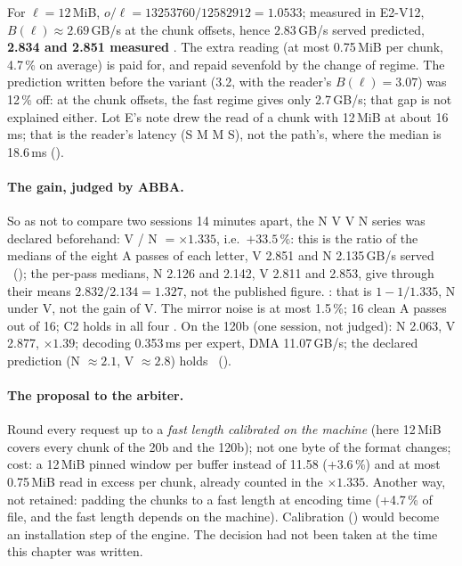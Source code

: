 For $\ell = 12$\,MiB, $o/\ell = \num{13253760} / \num{12582912} = 1.0533$; measured in E2-V12, $B(\ell) \approx 2.69$\,GB/s at the chunk offsets, hence $2.83$\,GB/s served predicted, \textbf{2.834 and 2.851 measured} \calc. The extra reading (at most 0.75\,MiB per chunk, 4.7\,\% on average) is paid for, and repaid sevenfold by the change of regime.  The prediction written before the variant (3.2, with the reader's $B(\ell) = 3.07$) was 12\,\% off: at the chunk offsets, the fast regime gives only 2.7\,GB/s; that gap is not explained either.  Lot E's note drew the read of a chunk with 12\,MiB at about 16\,ms; that is the reader's latency (S M M S), not the path's, where the median is 18.6\,ms ().

\paragraph{The gain, judged by ABBA.} So as not to compare two sessions 14 minutes apart, the N V V N series was declared beforehand: V / N $= \times 1.335$, i.e.\ $+33.5\,\%$: this is the ratio of the medians of the eight A passes of each letter, V 2.851 and N 2.135\,GB/s served \calc~(); the per-pass medians, N 2.126 and 2.142, V 2.811 and 2.853, give through their means $2.832 / 2.134 = 1.327$, not the published figure. : that is $1 - 1/1.335$, N under V, not the gain of V. The mirror noise is at most 1.5\,\%; 16 clean A passes out of 16; C2 holds in all four \mes. On the 120b (one session, not judged): N 2.063, V 2.877, $\times 1.39$; decoding 0.353\,ms per expert, DMA 11.07\,GB/s; the declared prediction (N $\approx 2.1$, V $\approx 2.8$) holds \mes~().

\paragraph{The proposal to the arbiter.} Round every request up to a \emph{fast length calibrated on the machine} (here 12\,MiB covers every chunk of the 20b and the 120b); not one byte of the format changes; cost: a 12\,MiB pinned window per buffer instead of 11.58 (+3.6\,\%) and at most 0.75\,MiB read in excess per chunk, already counted in the $\times 1.335$. Another way, not retained: padding the chunks to a fast length at encoding time (+4.7\,\% of file, and the fast length depends on the machine). Calibration () would become an installation step of the engine. The decision had not been taken at the time this chapter was written.

